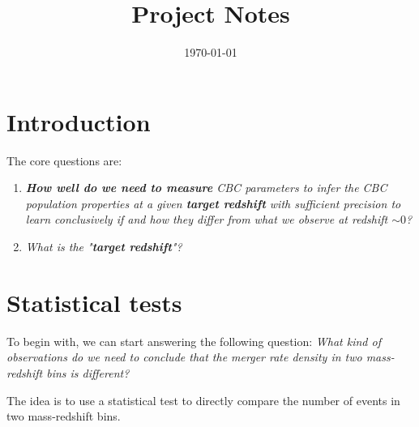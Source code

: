 \documentclass[12pt,a4paper]{article}
\title{Project Notes}
\date{\today}
\begin{document}
\maketitle

\section{Introduction}
The core questions are:
\begin{enumerate}
    \item \textit{\textbf{How well do we need to measure} CBC parameters to infer the CBC population properties at a given \textbf{target redshift} with sufficient precision to learn conclusively if and how they differ from what we observe at redshift \(\sim 0\)?}
    \item \textit{What is the "\textbf{target redshift}"?}
\end{enumerate}

\section{Statistical tests}
To begin with, we can start answering the following question:
\noindent \textit{What kind of observations do we need to conclude that the merger rate density in two mass-redshift bins is different?}

The idea is to use a statistical test to directly compare the number of events in two mass-redshift bins.
\end{document}
